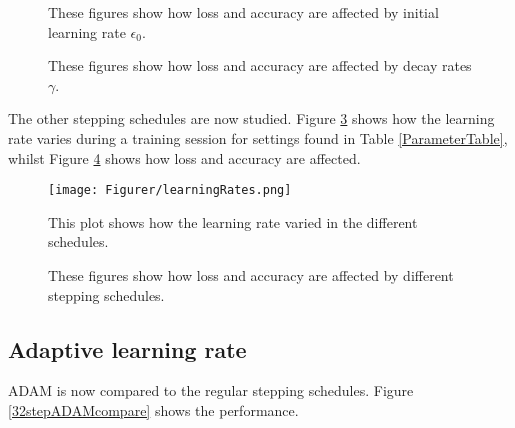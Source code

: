 \documentclass{article}
\begin{document}
\begin{figure}[H]
  \centering
  \hfill
  \caption{These figures show how loss and accuracy are affected by initial learning rate $\epsilon_0$.}
  \label{itdVary}
\end{figure}
\begin{figure}[H]
  \centering
  \hfill
  \caption{These figures show how loss and accuracy are affected by decay rates $\gamma$.}
\label{itdgamma}
\end{figure}

\noindent The other stepping schedules are now studied. Figure \ref{fig:step schedule} shows how the learning rate varies during a training session for settings found in Table \ref{ParameterTable}, whilst Figure \ref{32stepcompare} shows how loss and accuracy are affected.
\begin{figure}[H]
    \centering
    \texttt{[image: Figurer/learningRates.png]}
    \caption{This plot shows how the learning rate varied in the different schedules.}
    \label{fig:step schedule}
\end{figure}
\begin{figure}[H]
  \centering
  \hfill
  \caption{These figures show how loss and accuracy are affected by different stepping schedules.}
  \label{32stepcompare}
\end{figure}


\subsection{Adaptive learning rate}\label{sec: adaptive res}

\noindent ADAM is now compared to the regular stepping schedules. Figure \ref{32stepADAMcompare} shows the performance.
\end{document}
